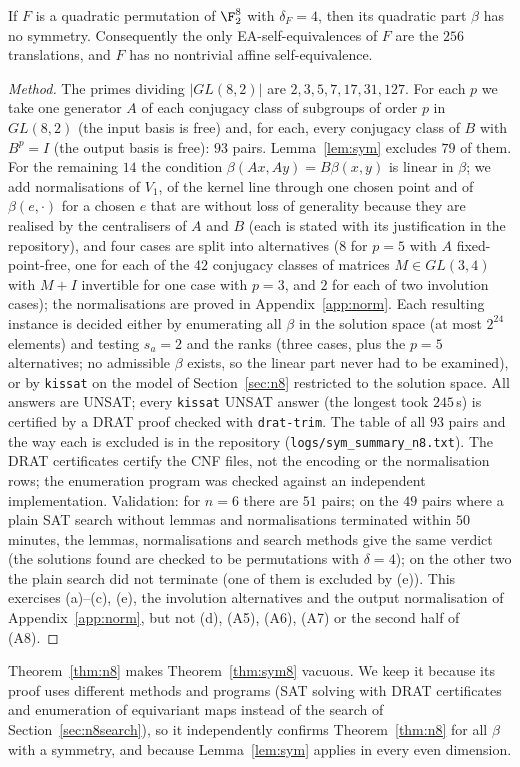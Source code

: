 \begin{theorem}\label{thm:sym8}
If $F$ is a quadratic permutation of $\F_2^8$ with $\delta_F=4$, then its quadratic part $\beta$
has no symmetry. Consequently the only EA-self-equivalences of $F$ are the $256$
translations, and $F$ has no nontrivial affine self-equivalence.
\end{theorem}
\begin{proof}[Method]
The primes dividing $|GL(8,2)|$ are $2,3,5,7,17,31,127$. For each $p$ we take one generator
$A$ of each conjugacy class of subgroups of order $p$ in $GL(8,2)$ (the input basis is free)
and, for each, every conjugacy class of $B$ with $B^p=I$ (the output basis is free): $93$ pairs.
Lemma~\ref{lem:sym} excludes $79$ of them. For the remaining $14$ the condition
$\beta(Ax,Ay)=B\beta(x,y)$ is linear in $\beta$; we add normalisations of $V_1$, of the kernel
line through one chosen point and of $\beta(e,\cdot)$ for a chosen $e$ that are without loss of
generality because they are realised by the centralisers of $A$ and $B$ (each is stated with
its justification in the repository), and four cases are split into alternatives ($8$ for $p=5$
with $A$ fixed-point-free, one for each of the $42$ conjugacy classes of matrices
$M\in GL(3,4)$ with $M+I$ invertible for one case with $p=3$, and $2$ for each of two involution
cases); the normalisations are proved in Appendix~\ref{app:norm}. Each resulting instance is
decided either by enumerating all $\beta$ in the solution space (at most $2^{24}$ elements) and
testing $s_a=2$ and the ranks (three cases, plus the $p=5$ alternatives; no admissible $\beta$
exists, so the linear part never had to be examined), or by \texttt{kissat} on the model of
Section~\ref{sec:n8} restricted to the solution space. All answers are UNSAT; every
\texttt{kissat} UNSAT answer (the longest took $245$\,s) is certified by a DRAT proof checked
with \texttt{drat-trim}. The table of all $93$ pairs and the way each is excluded is in the
repository (\texttt{logs/sym\_summary\_n8.txt}).
The DRAT certificates certify the CNF files, not the encoding or the normalisation rows; the
enumeration program was checked against an independent implementation. Validation: for $n=6$
there are $51$ pairs; on the $49$ pairs where a plain SAT search without lemmas and
normalisations terminated within $50$ minutes, the lemmas, normalisations and search methods give
the same verdict (the solutions found are checked to be permutations with $\delta=4$); on the
other two the plain search did not terminate (one of them is excluded by (e)). This exercises (a)--(c), (e), the involution alternatives and the output
normalisation of Appendix~\ref{app:norm}, but not (d), (A5), (A6), (A7) or the second half
of (A8).
\end{proof}
Theorem~\ref{thm:n8} makes Theorem~\ref{thm:sym8} vacuous. We keep it because its proof uses
different methods and programs (SAT solving with DRAT certificates and enumeration of
equivariant maps instead of the search of Section~\ref{sec:n8search}), so it independently
confirms Theorem~\ref{thm:n8} for all $\beta$ with a symmetry, and because Lemma~\ref{lem:sym}
applies in every even dimension.




